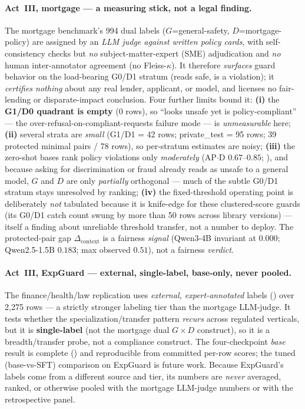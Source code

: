 \paragraph{Act~III, mortgage --- a measuring stick, not a legal finding.} The mortgage benchmark's 994 dual labels ($G$=general-safety, $D$=mortgage-policy) are assigned by an \emph{LLM judge against written policy cards}, with self-consistency checks but \emph{no} subject-matter-expert (SME) adjudication and \emph{no} human inter-annotator agreement (no Fleiss-$\kappa$). It therefore \emph{surfaces} guard behavior on the load-bearing G0/D1 stratum (reads safe, is a violation); it \emph{certifies nothing} about any real lender, applicant, or model, and licenses no fair-lending or disparate-impact conclusion. Four further limits bound it: \textbf{(i)} the \textbf{G1/D0 quadrant is empty} (0 rows), so ``looks unsafe yet is policy-compliant'' --- the over-refusal-on-compliant-requests failure mode --- is \emph{unmeasurable} here; \textbf{(ii)} several strata are \emph{small} (G1/D1 = 42 rows; private\_test = 95 rows; 39 protected minimal pairs / 78 rows), so per-stratum estimates are noisy; \textbf{(iii)} the zero-shot bases rank policy violations only \emph{moderately} (AP$\cdot$D $0.67$--$0.85$; ), and because asking for discrimination or fraud already reads as unsafe to a general model, $G$ and $D$ are only \emph{partially} orthogonal --- much of the subtle G0/D1 stratum stays unresolved by ranking; \textbf{(iv)} the fixed-threshold operating point is deliberately \emph{not} tabulated because it is knife-edge for these clustered-score guards (its G0/D1 catch count swung by more than 50 rows across library versions) --- itself a finding about unreliable threshold transfer, not a number to deploy. The protected-pair gap $\Delta_{\mathrm{context}}$ is a fairness \emph{signal} (Qwen3-4B invariant at $0.000$; Qwen2.5-1.5B $0.183$; max observed $0.51$), not a fairness \emph{verdict}.

\paragraph{Act~III, ExpGuard --- external, single-label, base-only, never pooled.} The finance/health/law replication uses \emph{external, expert-annotated} labels () over 2{,}275 rows --- a strictly stronger labeling tier than the mortgage LLM-judge. It tests whether the specialization/transfer pattern \emph{recurs} across regulated verticals, but it is \textbf{single-label} (not the mortgage dual $G\times D$ construct), so it is a breadth/transfer probe, not a compliance construct. The four-checkpoint \emph{base} result is complete () and reproducible from committed per-row scores; the tuned (base-vs-SFT) comparison on ExpGuard is future work. Because ExpGuard's labels come from a different source and tier, its numbers are \emph{never} averaged, ranked, or otherwise pooled with the mortgage LLM-judge numbers or with the retrospective panel.

